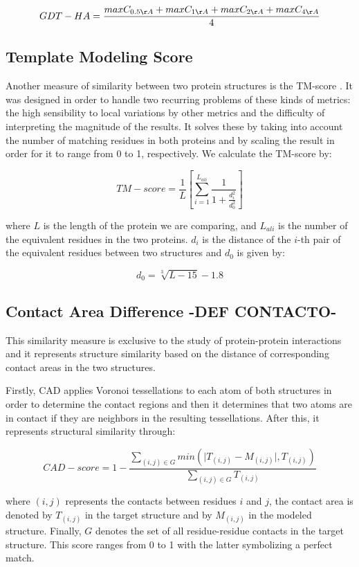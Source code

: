 $$ GDT-HA = \frac{ max C_{0.5\AA} + max C_{1\AA} + max C_{2\AA} + max C_{4\AA} } {4} $$

\subsection{Template Modeling Score}

Another measure of similarity between two protein structures is the TM-score \cite{zhang2004scoring}. It was designed in order to handle two recurring problems of these kinds of metrics: the high sensibility to local variations by other metrics and the difficulty of interpreting the magnitude of the results. It solves these by taking into account the number of matching residues in both proteins and by scaling the result in order for it to range from 0 to 1, respectively. We calculate the TM-score by:

$$TM-score = \frac{1}{L} \left[ \sum_{i=1}^{L_{ali}} \frac{1}{1 + \frac{d_i^2}{d_0^2}}\right]$$

where $L$ is the length of the protein we are comparing, and $L_{ali}$ is the number of the equivalent residues in the two proteins. $d_i$ is the distance of the $i$-th pair of the equivalent residues between two structures and $d_0$ is given by:

$$d_0 = \sqrt[3]{L-15}-1.8$$

\subsection{Contact Area Difference -DEF CONTACTO-}

This similarity measure is exclusive to the study of protein-protein interactions and it represents structure similarity based on the distance of corresponding contact areas in the two structures.

Firstly, CAD applies Voronoi tessellations to each atom of both structures in order to determine the contact regions and then it determines that two atoms are in contact if they are neighbors in the resulting tessellations. After this, it represents structural similarity through:

$$CAD-score = 1 - \frac{\sum_{(i,j) \in G}^{} min \left ( \mid T_{(i,j)} -M_{(i,j)} \mid , T_{(i,j)} \right) }{\sum_{(i,j) \in G} T_{(i,j)}}$$

where $(i,j)$ represents the contacts between residues $i$ and $j$, the contact area is denoted by $T_{(i,j)}$ in the target structure and by $M_{(i,j)}$ in the modeled structure. Finally, $G$ denotes the set of all residue-residue contacts in the target structure. This score ranges from 0 to 1 with the latter symbolizing a perfect match.

